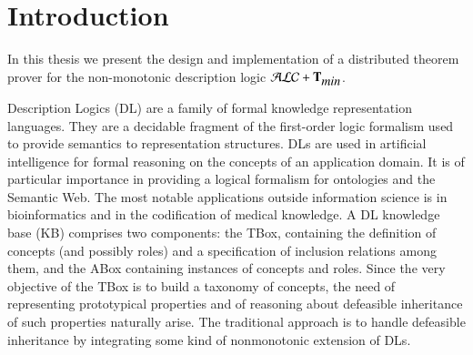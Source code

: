 \documentclass[a4paper, 11pt, oneside]{elsarticle}
\newcommand{\tip}{{\bf T}}
\newcommand{\alctmin}{\mathcal{ALC}+\tip_{\mbox{\em min}}}
\begin{document}
\newpage


\tableofcontents

\newpage


\section{Introduction}

In this thesis we present the design and implementation of a distributed theorem prover for the non-monotonic description logic $\alctmin$.

Description Logics (DL) are a family of formal knowledge representation languages. They are a decidable fragment of the first-order logic formalism used to provide semantics to representation structures.
DLs are used in artificial intelligence for formal reasoning on the concepts of an application domain. It is of particular importance in providing a logical formalism for ontologies and the Semantic Web. The most notable applications outside information science is in bioinformatics and in the codification of medical knowledge. A DL knowledge base (KB) comprises two components: the TBox, containing the definition of concepts (and possibly roles) and a specification of inclusion relations among them, and the ABox containing instances of concepts and roles. Since the very objective of the TBox is to build a taxonomy of concepts, the need of representing prototypical properties and of reasoning about defeasible inheritance of such properties naturally arise. The traditional approach is to handle defeasible inheritance by integrating some kind of nonmonotonic extension of DLs.


\end{document}
